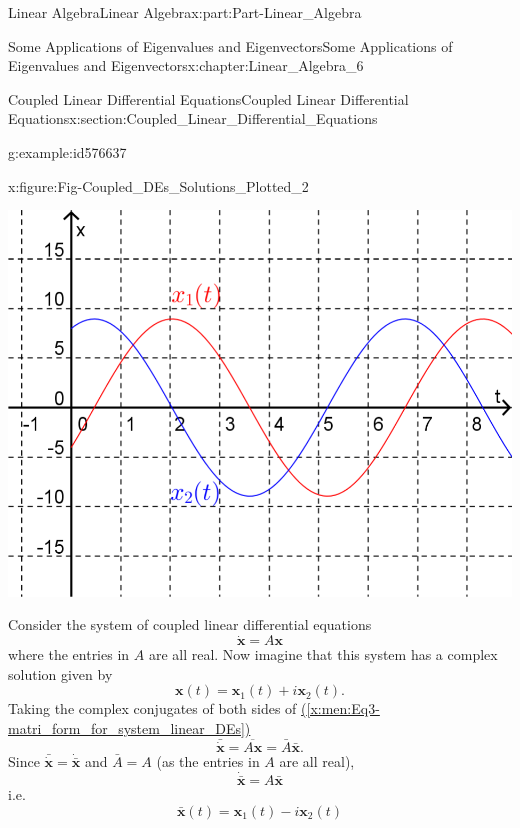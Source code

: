 \documentclass[oneside,10pt,]{book}
\newcommand{\xreffont}{\relax}
\numberwithin{equation}{section}
\newcommand{\bm}[1]{\boldsymbol{#1}}
\begin{document}
\begin{partptx}{Linear Algebra}{}{Linear Algebra}{}{}{x:part:Part-Linear_Algebra}
\begin{chapterptx}{Some Applications of Eigenvalues and Eigenvectors}{}{Some Applications of Eigenvalues and Eigenvectors}{}{}{x:chapter:Linear_Algebra_6}
\begin{sectionptx}{Coupled Linear Differential Equations}{}{Coupled Linear Differential Equations}{}{}{x:section:Coupled_Linear_Differential_Equations}
\begin{example}{}{g:example:id576637}
\begin{figureptx}{}{x:figure:Fig-Coupled_DEs_Solutions_Plotted_2}{}
\begin{image}{0.15}{0.7}{0.15}
\includegraphics[width=\linewidth]{./LinearAlgebra/Images/6/Fig2-solution_curves_plotted_2.png}
\end{image}%
\tcblower
\end{figureptx}%
\end{example}
Consider the system of coupled linear differential equations%
\begin{equation}
\dot{\bm{x}} = A \bm{x}\label{x:men:Eq3-matri_form_for_system_linear_DEs}
\end{equation}
where the entries in \(A\) are all real. Now imagine that this system has a complex solution given by%
\begin{equation}
\bm{x}(t) = \bm{x}_1(t) + i \bm{x}_2(t)\text{.}\label{x:men:Eq4-complex_solution}
\end{equation}
Taking the complex conjugates of both sides of \hyperref[x:men:Eq3-matri_form_for_system_linear_DEs]{({\xreffont\ref{x:men:Eq3-matri_form_for_system_linear_DEs}})}%
\begin{equation*}
\bar{\dot{\bm{x}}} = \overline{A \bm{x}} = \bar{A} \bar{\bm{x}}\text{.}
\end{equation*}
Since \(\bar{\dot{\bm{x}}} = \dot{\bar{\bm{x}}}\) and \(\bar{A} = A\) (as the entries in \(A\) are all real),%
\begin{equation*}
\dot{\bar{\bm{x}}} = A \bar{\bm{x}}
\end{equation*}
i.e.%
\begin{equation}
\bar{\bm{x}}(t) = \bm{x}_1(t) - i \bm{x}_2 (t)\label{x:men:Eq5-complex_conjugate_solution}
\end{equation}

\end{sectionptx}
\end{chapterptx}
\end{partptx}
\end{document}
